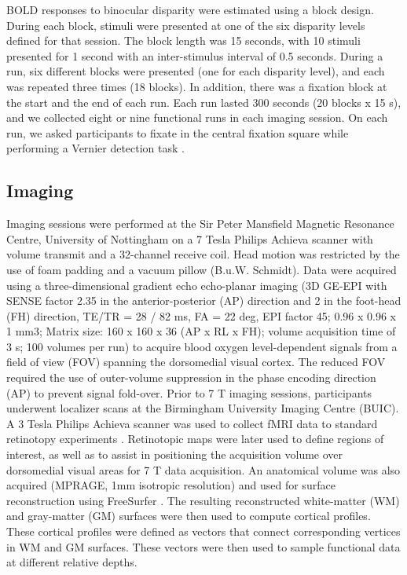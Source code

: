 BOLD responses to binocular disparity were estimated using a block design. During each block, stimuli were presented at one of the six disparity levels defined for that session. The block length was 15 seconds, with 10 stimuli presented for 1 second with an inter-stimulus interval of 0.5 seconds. During a run, six different blocks were presented (one for each disparity level), and each was repeated three times (18 blocks). In addition, there was a fixation block at the start and the end of each run. Each run lasted 300 seconds (20 blocks x 15 s), and we collected eight or nine functional runs in each imaging session. On each run, we asked participants to fixate in the central fixation square while performing a Vernier detection task \cite{Preston:2008dg}. 

\subsection{Imaging}
Imaging sessions were performed at the Sir Peter Mansfield Magnetic Resonance Centre, University of Nottingham on a 7 Tesla Philips Achieva scanner with volume transmit and a 32-channel receive coil. Head motion was restricted by the use of foam padding and a vacuum pillow (B.u.W. Schmidt). Data were acquired using a three-dimensional gradient echo echo-planar imaging (3D GE-EPI with SENSE factor 2.35 in the anterior-posterior (AP) direction and 2 in the foot-head (FH) direction, TE/TR = 28 / 82 ms, FA = 22 deg, EPI factor 45; 0.96 x 0.96 x 1 mm3; Matrix size: 160 x 160 x 36 (AP x RL x FH); volume acquisition time of 3 s; 100 volumes per run) to acquire blood oxygen level-dependent signals from a field of view (FOV) spanning the dorsomedial visual cortex. The reduced FOV required the use of outer-volume suppression in the phase encoding direction (AP) to prevent signal fold-over.
Prior to 7 T imaging sessions, participants underwent localizer scans at the Birmingham University Imaging Centre (BUIC). A 3 Tesla Philips Achieva scanner was used to collect fMRI data to standard retinotopy experiments \cite{Preston:2008dg}. Retinotopic maps were later used to define regions of interest, as well as to assist in positioning the acquisition volume over dorsomedial visual areas for 7 T data acquisition. An anatomical volume was also acquired (MPRAGE, 1mm isotropic resolution) and used for surface reconstruction using FreeSurfer \cite{Dale:1999ks,Fischl:1999hg}. The resulting reconstructed white-matter (WM) and gray-matter (GM) surfaces were then used to compute cortical profiles. These cortical profiles were defined as vectors that connect corresponding vertices in WM and GM surfaces. These vectors were then used to sample functional data at different relative depths.
